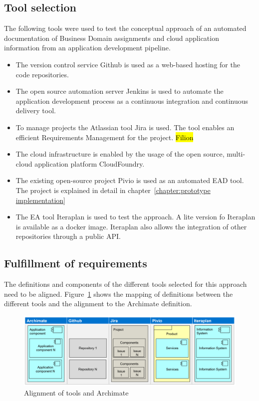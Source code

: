 \subsection{Tool selection}\label{subsection:toolselection}

The following tools were used to test the conceptual approach of an automated documentation of Business Domain assignments and cloud application information from an application development pipeline.
\begin{itemize}
    \item The version control service Github is used as a web-based hosting for the code repositories.
    \item The open source automation server Jenkins is used to automate the application development process as a continuous integration and continuous delivery tool.
    \item To manage projects the Atlassian tool Jira is used. The tool enables an efficient Requirements Management for the project. \hl{Filion}
    \item The cloud infrastructure is enabled by the usage of the open source, multi-cloud application platform CloudFoundry.
    \item The existing open-source project Pivio is used as an automated EAD tool. The project is explained in detail in chapter~\ref{chapter:prototype implementation}
    \item The EA tool Iteraplan is used to test the approach. A lite version fo Iteraplan is available as a docker image. Iteraplan also allows the integration of other repositories through a public API.
\end{itemize}

\subsection{Fulfillment of requirements}\label{subsection:fulfillmentrequirements}

The definitions and components of the different tools selected for this approach need to be aligned. Figure~\ref{fig:tools-mapping} shows the mapping of definitions between the different tools and the alignment to the Archimate definition.

\begin{figure}[htpb]
  \centering
  \includegraphics[width=1.0\textwidth]{figures/tools-mapping.PNG}
  \caption{Alignment of tools and Archimate}
  \label{fig:tools-mapping}
\end{figure}

